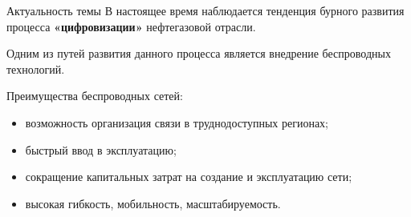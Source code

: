 \begin{frame}
    {Актуальность темы}
    \justifying
    В настоящее время наблюдается тенденция бурного развития процесса \textbf{«цифровизации»} нефтегазовой отрасли.
    
    \bigskip

    Одним из путей развития данного процесса является внедрение беспроводных технологий.
    \bigskip

    Преимущества беспроводных сетей:
    \begin{itemize}
        \item возможность организация связи в труднодоступных регионах;
        \item быстрый ввод в эксплуатацию;
        \item сокращение капитальных затрат на создание и эксплуатацию сети; 
        \item высокая гибкость, мобильность, масштабируемость.
    \end{itemize}

    
\end{frame}



